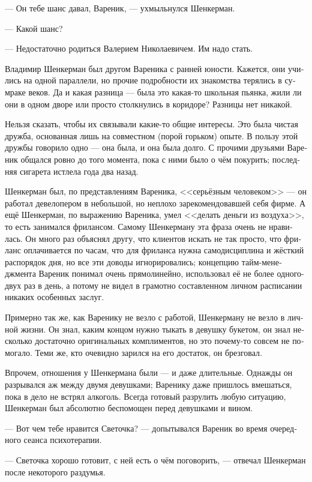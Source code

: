\documentclass[a5paper,12pt,fleqn]{extbook}\usepackage{cooltooltips}\usepackage{polyglossia}\setdefaultlanguage[babelshorthands=true]{russian}\setotherlanguage{english}\defaultfontfeatures{Ligatures=TeX,Mapping=tex-text} \usepackage{xcolor}\definecolor{lightgray}{HTML}{bbbbbb}\color{lightgray}\newcommand{\ml}[3]{\textenglish{\textcolor{black}{#3}}}
\begin{document}
--- Он тебе шанс давал, Вареник, --- ухмыльнулся Шенкерман.

--- Какой шанс?

--- Недостаточно родиться Валерием Николаевичем.
Им надо стать.

Владимир Шенкерман был другом Вареника с ранней юности.
Кажется, они учились на одной параллели, но прочие подробности их знакомства терялись в сумраке веков.
Да и какая разница --- была это какая-то школьная пьянка, жили ли они в одном дворе или просто столкнулись в коридоре?
Разницы нет никакой.

Нельзя сказать, чтобы их связывали какие-то общие интересы.
Это была чистая дружба, основанная лишь на совместном (порой горьком) опыте.
В пользу этой дружбы говорило одно --- она была, и она была долго.
С прочими друзьями Вареник общался ровно до того момента, пока с ними было о чём покурить;
последняя сигарета истлела года два назад.

Шенкерман был, по представлениям Вареника, <<серьёзным человеком>> --- он работал девелопером в небольшой, но неплохо зарекомендовавшей себя фирме.
А ещё Шенкерман, по выражению Вареника, умел <<делать деньги из воздуха>>, то есть занимался фрилансом.
Самому Шенкерману эта фраза очень не нравилась.
Он много раз объяснял другу, что клиентов искать не так просто, что фриланс оплачивается по часам, что для фриланса нужна самодисциплина и жёсткий распорядок дня, но все эти доводы игнорировались;
концепцию тайм-менеджмента Вареник понимал очень прямолинейно, использовал её не более одного-двух раз в день, а потому не видел в грамотно составленном личном расписании никаких особенных заслуг.

Примерно так же, как Варенику не везло с работой, Шенкерману не везло в личной жизни.
Он знал, каким концом нужно тыкать в девушку букетом, он знал несколько достаточно оригинальных комплиментов, но это почему-то совсем не помогало.
Теми же, кто очевидно зарился на его достаток, он брезговал.

Впрочем, отношения у Шенкермана были --- и даже длительные.
Однажды он разрывался аж между двумя девушками;
Варенику даже пришлось вмешаться, пока в дело не встрял алкоголь.
Всегда готовый разрулить любую ситуацию, Шенкерман был абсолютно беспомощен перед девушками и вином.

--- Вот чем тебе нравится Светочка? --- допытывался Вареник во время очередного сеанса психотерапии.

--- Светочка хорошо готовит, с ней есть о чём поговорить, --- отвечал Шенкерман после некоторого раздумья.
\end{document}
